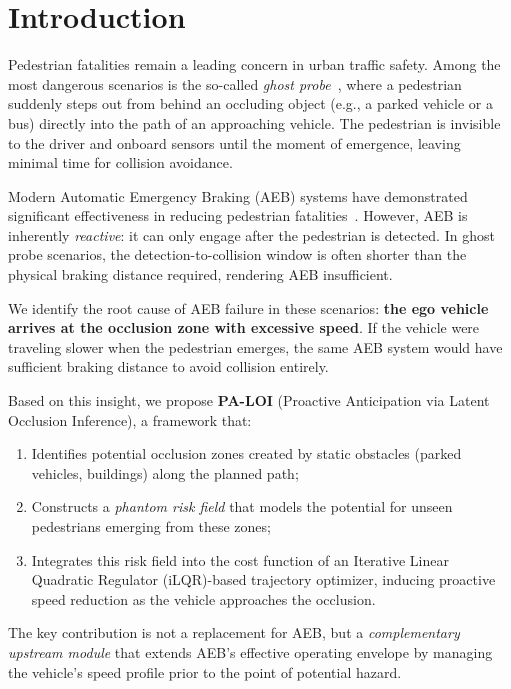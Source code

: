 \documentclass[conference]{IEEEtran}
\begin{document}
\section{Introduction}

Pedestrian fatalities remain a leading concern in urban traffic safety. Among the most dangerous scenarios is the so-called \emph{ghost probe}~\cite{euroncap2023}, where a pedestrian suddenly steps out from behind an occluding object (e.g., a parked vehicle or a bus) directly into the path of an approaching vehicle. The pedestrian is invisible to the driver and onboard sensors until the moment of emergence, leaving minimal time for collision avoidance.

Modern Automatic Emergency Braking (AEB) systems have demonstrated significant effectiveness in reducing pedestrian fatalities~\cite{cicchino2022effects}. However, AEB is inherently \emph{reactive}: it can only engage after the pedestrian is detected. In ghost probe scenarios, the detection-to-collision window is often shorter than the physical braking distance required, rendering AEB insufficient.

We identify the root cause of AEB failure in these scenarios: \textbf{the ego vehicle arrives at the occlusion zone with excessive speed}. If the vehicle were traveling slower when the pedestrian emerges, the same AEB system would have sufficient braking distance to avoid collision entirely.

Based on this insight, we propose \textbf{PA-LOI} (Proactive Anticipation via Latent Occlusion Inference), a framework that:
\begin{enumerate}
    \item Identifies potential occlusion zones created by static obstacles (parked vehicles, buildings) along the planned path;
    \item Constructs a \emph{phantom risk field} that models the potential for unseen pedestrians emerging from these zones;
    \item Integrates this risk field into the cost function of an Iterative Linear Quadratic Regulator (iLQR)-based trajectory optimizer, inducing proactive speed reduction as the vehicle approaches the occlusion.
\end{enumerate}

The key contribution is not a replacement for AEB, but a \emph{complementary upstream module} that extends AEB's effective operating envelope by managing the vehicle's speed profile prior to the point of potential hazard.
\end{document}
